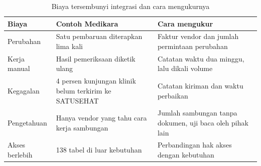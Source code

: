 \begin{table}[!htb]
  \centering
  \caption{Biaya tersembunyi integrasi dan cara mengukurnya}
  \label{tab:ch04-biaya-tersembunyi}
  \small
  \begin{tabularx}{\textwidth}{K{2.6cm}JJ}
    \hline
    \textbf{Biaya} & \textbf{Contoh Medikara} & \textbf{Cara mengukur} \\ \hline
    Perubahan & Satu pembaruan diterapkan lima kali & Faktur vendor dan jumlah permintaan perubahan \\ \hline
    Kerja manual & Hasil pemeriksaan diketik ulang & Catatan waktu dua minggu, lalu dikali volume \\ \hline
    Kegagalan & 4 persen kunjungan klinik belum terkirim ke SATUSEHAT & Catatan kiriman dan waktu perbaikan \\ \hline
    Pengetahuan & Hanya vendor yang tahu cara kerja sambungan & Jumlah sambungan tanpa dokumen, uji baca oleh pihak lain \\ \hline
    Akses berlebih & 138 tabel di luar kebutuhan & Perbandingan hak akses dengan kebutuhan \\ \hline
  \end{tabularx}
\end{table}

